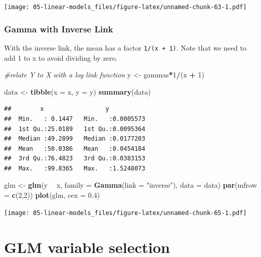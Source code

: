 \documentclass[
  openany]{book}
\newenvironment{Shaded}{\begin{snugshade}}{\end{snugshade}}
\newcommand{\CommentTok}[1]{\textcolor[rgb]{0.56,0.35,0.01}{\textit{#1}}}
\newcommand{\DataTypeTok}[1]{\textcolor[rgb]{0.13,0.29,0.53}{#1}}
\newcommand{\DecValTok}[1]{\textcolor[rgb]{0.00,0.00,0.81}{#1}}
\newcommand{\FloatTok}[1]{\textcolor[rgb]{0.00,0.00,0.81}{#1}}
\newcommand{\KeywordTok}[1]{\textcolor[rgb]{0.13,0.29,0.53}{\textbf{#1}}}
\newcommand{\NormalTok}[1]{#1}
\newcommand{\OperatorTok}[1]{\textcolor[rgb]{0.81,0.36,0.00}{\textbf{#1}}}
\newcommand{\StringTok}[1]{\textcolor[rgb]{0.31,0.60,0.02}{#1}}
\begin{document}
\texttt{[image: 05-linear-models\_files/figure-latex/unnamed-chunk-63-1.pdf]}

\hypertarget{gamma-with-inverse-link}{%
\subsection{Gamma with Inverse Link}\label{gamma-with-inverse-link}}

With the inverse link, the mean has a factor \texttt{1/(x\ +\ 1)}. Note that we need to add 1 to x to avoid dividing by zero.

\begin{Shaded}
\begin{Highlighting}[]
\CommentTok{#relate Y to X with a log link function}
\NormalTok{y <-}\StringTok{ }\NormalTok{gammas}\OperatorTok{*}\DecValTok{1}\OperatorTok{/}\NormalTok{(x }\OperatorTok{+}\StringTok{ }\DecValTok{1}\NormalTok{)}

\NormalTok{data <-}\StringTok{ }\KeywordTok{tibble}\NormalTok{(}\DataTypeTok{x =}\NormalTok{ x, }\DataTypeTok{y  =}\NormalTok{ y)}
\KeywordTok{summary}\NormalTok{(data)}
\end{Highlighting}
\end{Shaded}

\begin{verbatim}
##        x                 y            
##  Min.   : 0.1447   Min.   :0.0005573  
##  1st Qu.:25.0189   1st Qu.:0.0095364  
##  Median :49.2899   Median :0.0177203  
##  Mean   :50.0386   Mean   :0.0454184  
##  3rd Qu.:76.4823   3rd Qu.:0.0383153  
##  Max.   :99.8365   Max.   :1.5248073
\end{verbatim}

\begin{Shaded}
\begin{Highlighting}[]
\NormalTok{glm <-}\StringTok{ }\KeywordTok{glm}\NormalTok{(y }\OperatorTok{~}\StringTok{ }\NormalTok{x, }\DataTypeTok{family =} \KeywordTok{Gamma}\NormalTok{(}\DataTypeTok{link =} \StringTok{"inverse"}\NormalTok{), }\DataTypeTok{data =}\NormalTok{ data)}
\KeywordTok{par}\NormalTok{(}\DataTypeTok{mfrow =} \KeywordTok{c}\NormalTok{(}\DecValTok{2}\NormalTok{,}\DecValTok{2}\NormalTok{))}
\KeywordTok{plot}\NormalTok{(glm, }\DataTypeTok{cex =} \FloatTok{0.4}\NormalTok{)}
\end{Highlighting}
\end{Shaded}

\texttt{[image: 05-linear-models\_files/figure-latex/unnamed-chunk-65-1.pdf]}

\hypertarget{glm-variable-selection}{%
\chapter{GLM variable selection}\label{glm-variable-selection}}
\end{document}
